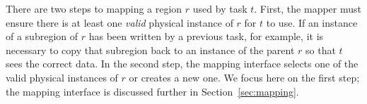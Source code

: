 There are two steps to mapping a region $r$ used by
task $t$.  First, the mapper must ensure there is at least one {\em valid}
physical instance of $r$ for $t$ to use.  If an instance of a subregion of $r$ has been written by a previous task,
for example, it is necessary to copy that subregion back to an instance of the parent $r$ so that $t$
sees the correct data. In the second step, the mapping interface selects one of the
valid physical instances of $r$ or creates a new one.  
We focus here on the first step; the mapping interface is discussed further in Section~\ref{sec:mapping}.





